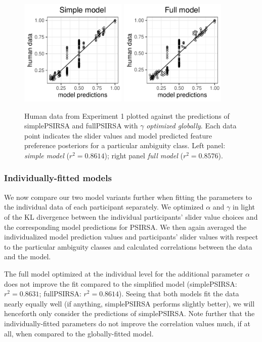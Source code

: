 \documentclass[10pt,a4paper]{article}
\newcommand{\gcs}[1]{\textcolor{blue}{[gcs: #1]}}
\begin{document}
\begin{figure}[ht]
	\centering
	\includegraphics[width=2in]{images/m13.pdf}
	\includegraphics[width=2in]{images/m23.pdf}
	\caption{Human data from Experiment 1 plotted against the predictions of simplePSIRSA and fullPSIRSA with $\gamma$ \emph{optimized globally}. Each data point indicates the slider values and model predicted feature preference posteriors for a particular ambiguity class. Left panel: \emph{simple model} ($r^2 = 0.8614$); right panel \emph{full model} ($r^2 = 0.8576$).}
		\label{simple-full}
\end{figure}


\subsubsection{Individually-fitted models}

We now compare our two model variants further when fitting the parameters to the individual data of each participant separately. 
We optimized $\alpha$ and $\gamma$ in light of the KL divergence between the individual participants' slider value choices and the corresponding model predictions for PSIRSA.
We then again averaged the individualized model prediction values and participants' slider values with respect to the particular ambiguity classes and calculated correlations between the data and the model.


The full model optimized at the individual level for the additional parameter $\alpha$ does not improve the fit compared to the simplified model (simplePSIRSA: $r^{2}=0.8631$; fullPSIRSA: $r^{2}=0.8614$). 
Seeing that both models fit the data nearly equally well (if anything, simplePSIRSA performs slightly better), we will henceforth only consider the predictions of simplePSIRSA.
Note further that the individually-fitted parameters do not improve the correlation values much, if at all, when compared to the globally-fitted model. 
\end{document}
